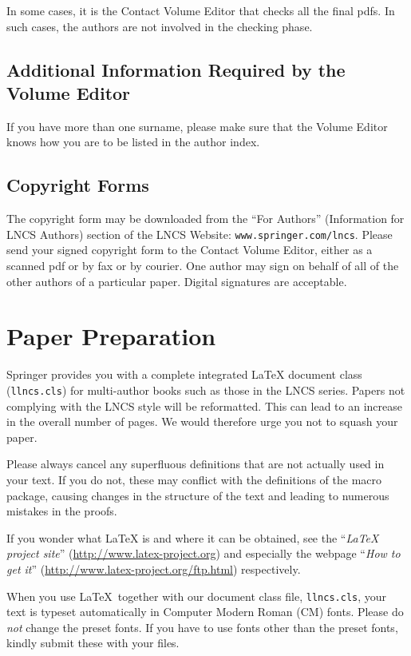\documentclass[runningheads,a4paper]{llncs}
\begin{document}
In some cases, it is the Contact Volume Editor that checks all the final
pdfs. In such cases, the authors are not involved in the checking phase.

\subsection{Additional Information Required by the Volume Editor}

If you have more than one surname, please make sure that the Volume Editor
knows how you are to be listed in the author index.

\subsection{Copyright Forms}

The copyright form may be downloaded from the ``For Authors''
(Information for LNCS Authors) section of the LNCS Website:
\texttt{www.springer.com/lncs}. Please send your signed copyright form
to the Contact Volume Editor, either as a scanned pdf or by fax or by
courier. One author may sign on behalf of all of the other authors of a
particular paper. Digital signatures are acceptable.

\section{Paper Preparation}

Springer provides you with a complete integrated \LaTeX{} document class
(\texttt{llncs.cls}) for multi-author books such as those in the LNCS
series. Papers not complying with the LNCS style will be reformatted.
This can lead to an increase in the overall number of pages. We would
therefore urge you not to squash your paper.

Please always cancel any superfluous definitions that are
not actually used in your text. If you do not, these may conflict with
the definitions of the macro package, causing changes in the structure
of the text and leading to numerous mistakes in the proofs.

If you wonder what \LaTeX{} is and where it can be obtained, see the
``\textit{LaTeX project site}'' (\url{http://www.latex-project.org})
and especially the webpage ``\textit{How to get it}''
(\url{http://www.latex-project.org/ftp.html}) respectively.

When you use \LaTeX\ together with our document class file,
\texttt{llncs.cls},
your text is typeset automatically in Computer Modern Roman (CM) fonts.
Please do
\emph{not} change the preset fonts. If you have to use fonts other
than the preset fonts, kindly submit these with your files.
\end{document}
